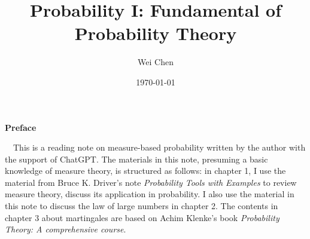 \documentclass[12pt]{article}
\title{{\Huge{\textbf{Probability I: Fundamental of Probability Theory}}}}
\author{Wei Chen}
\date{\today}
\theoremstyle{mystyle}
\theoremstyle{cstyle}
\theoremstyle{warn}
\begin{document}
	\maketitle
	\allowdisplaybreaks
	\setcounter{page}{1}
	\begin{center}
		\Large\textbf{Preface} 

        
        
    \end{center}~\
        This is a reading note on measure-based probability written by the author with the support of ChatGPT. The materials in this note, presuming a basic knowledge of measure theory, is structured as follows: in chapter 1, I use the material from Bruce K. Driver's note \textit{Probability Tools with Examples} to review measure theory, discuss its application in probability. I also use the material in this note to discuss the law of large numbers in chapter 2. The contents in chapter 3 about martingales are based on Achim Klenke's book \textit{Probability Theory: A comprehensive course}.
	\newpage
	\tableofcontents
	\clearpage
    
    
    
\end{document}

